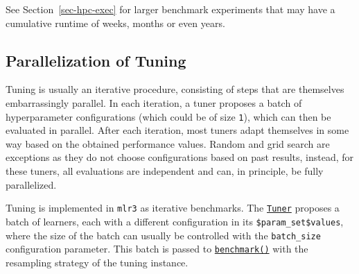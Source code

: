 \begin{Shaded}
\begin{Highlighting}[]
\OtherTok{=} \NormalTok{(}\NormalTok{(}\NormalTok{(}\NormalTok{, }\NormalTok{)),}
  \NormalTok{(}\NormalTok{(}\NormalTok{, }

\SpecialCharTok{::}\NormalTok{(}\NormalTok{)}

\OtherTok{=} 
\end{Highlighting}
\end{Shaded}

See Section~\ref{sec-hpc-exec} for larger benchmark experiments that may
have a cumulative runtime of weeks, months or even years.

\hypertarget{sec-parallel-tuning}{%
\subsection{Parallelization of Tuning}\label{sec-parallel-tuning}}

Tuning is usually an iterative procedure, consisting of steps that are
themselves embarrassingly parallel. In each iteration, a tuner proposes
a batch of hyperparameter configurations (which could be of size
\texttt{1}), which can then be evaluated in parallel. After each
iteration, most tuners adapt themselves in some way based on the
obtained performance values. Random and grid search are exceptions as
they do not choose configurations based on past results, instead, for
these tuners, all evaluations are independent and can, in principle, be
fully parallelized.

Tuning is implemented in \texttt{mlr3} as iterative benchmarks. The
\href{https://mlr3tuning.mlr-org.com/reference/Tuner.html}{\texttt{Tuner}}
proposes a batch of learners, each with a different configuration in its
\texttt{\$param\_set\$values}, where the size of the batch can usually
be controlled with the \texttt{batch\_size} configuration parameter.
This batch is passed to
\href{https://mlr3.mlr-org.com/reference/benchmark.html}{\texttt{benchmark()}}
with the resampling strategy of the tuning instance.

